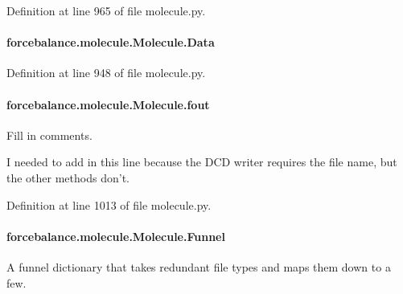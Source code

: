 Definition at line 965 of file molecule.\-py.

\hypertarget{classforcebalance_1_1molecule_1_1Molecule_a69c18c3fad45cd38102d9582445f5c6d}{
\paragraph[{Data}]{\setlength{\rightskip}{0pt plus 5cm}forcebalance.\-molecule.\-Molecule.\-Data}}\label{classforcebalance_1_1molecule_1_1Molecule_a69c18c3fad45cd38102d9582445f5c6d}


Definition at line 948 of file molecule.\-py.

\hypertarget{classforcebalance_1_1molecule_1_1Molecule_a2124792d405b58526af41475e4af3c80}{
\paragraph[{fout}]{\setlength{\rightskip}{0pt plus 5cm}forcebalance.\-molecule.\-Molecule.\-fout}}\label{classforcebalance_1_1molecule_1_1Molecule_a2124792d405b58526af41475e4af3c80}


Fill in comments. 

I needed to add in this line because the D\-C\-D writer requires the file name, but the other methods don't. 

Definition at line 1013 of file molecule.\-py.

\hypertarget{classforcebalance_1_1molecule_1_1Molecule_a491b10f21e93f841a770088402a13924}{
\paragraph[{Funnel}]{\setlength{\rightskip}{0pt plus 5cm}forcebalance.\-molecule.\-Molecule.\-Funnel}}\label{classforcebalance_1_1molecule_1_1Molecule_a491b10f21e93f841a770088402a13924}


A funnel dictionary that takes redundant file types and maps them down to a few. 



